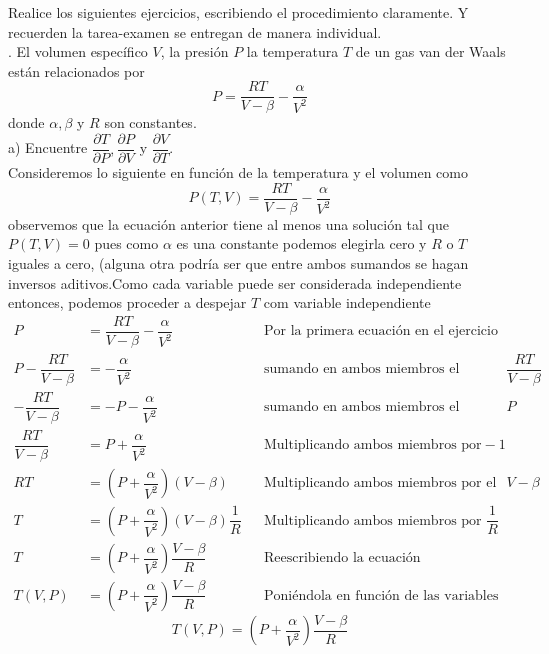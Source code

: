 \documentclass[letterpaper]{article}
\renewcommand{\d}{\partial}
\renewcommand{\*}{\cdot}
\theoremstyle{definition}
\begin{document}
\noindent Realice los siguientes ejercicios, escribiendo el procedimiento claramente. Y recuerden la tarea-examen se entregan de manera individual.\\
. El volumen específico $ V $, la presión $ P $  la temperatura $ T $ de un gas van der Waals están relacionados por
\[ P = \dfrac{RT}{V - \beta} - \dfrac{\alpha}{V^2} \] donde $ \alpha, \beta $ y $ R $ son constantes.\\

a) Encuentre $ \dfrac{\d T}{\d P}, \dfrac{\d P}{\d V} $ y $ \dfrac{\d V}{\d T} $.\\

Consideremos lo siguiente en función de la temperatura y el volumen como 
\[ P(T,V) = \dfrac{RT}{V - \beta} - \dfrac{\alpha}{V^2} \label{eq:uno}\tag{1} \]
observemos que la ecuación anterior tiene al menos una solución tal que $ P(T,V) = 0 $ pues como $ \alpha  $ es una constante podemos elegirla cero  y $ R $ o $ T $ iguales a cero, (alguna otra podría ser que entre ambos sumandos se hagan inversos aditivos.Como cada variable puede ser considerada independiente entonces, podemos proceder a despejar $ T $ com variable independiente
\begin{align*}
	P &= \dfrac{RT}{V - \beta} - \dfrac{\alpha}{V^2} &&\text{Por la primera ecuación en el ejercicio}\\
	P - \dfrac{RT}{V - \beta}&=  - \dfrac{\alpha}{V^2} &&\text{sumando en ambos miembros el inverso aditivo de } \dfrac{RT}{V - \beta}\\
	- \dfrac{RT}{V - \beta}&= -P - \dfrac{\alpha}{V^2} &&\text{sumando en ambos miembros el inverso aditivo de } P\\
	\dfrac{RT}{V - \beta}&= P + \dfrac{\alpha}{V^2} &&\text{Multiplicando ambos miembros por} -1\\
	RT&= \left(P + \dfrac{\alpha}{V^2}\right) (V - \beta) &&\text{Multiplicando ambos miembros por el inverso multiplicativo de } V - \beta\\
	T&= \left(P + \dfrac{\alpha}{V^2}\right) (V - \beta) \dfrac{1}{R} &&\text{Multiplicando ambos miembros por } \dfrac{1}{R}\\
	T&= \left(P + \dfrac{\alpha}{V^2}\right) \dfrac{V - \beta}{R} &&\text{Reescribiendo la ecuación}\\
	T (V,P)&= \left(P + \dfrac{\alpha}{V^2}\right) \dfrac{V - \beta}{R} &&\text{Poniéndola en función de las variables}
\end{align*}
\[ T(V,P) = \left( P + \dfrac{\alpha}{V^2} \right) \dfrac{V - \beta}{R} \label{eq:dos}\tag{2} \]
\end{document}
